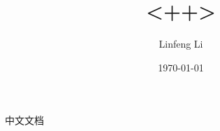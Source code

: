 \documentclass[UTF8]{ctexart}
\title{<++>}
\author{Linfeng Li}
\date{\today}
\begin{document}
\begin{multicols}{2}
中文文档
\end{multicols}
\end{document}
